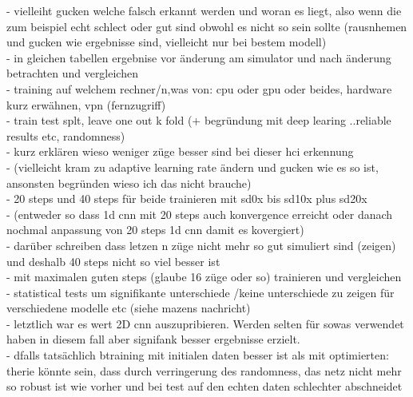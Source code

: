 - vielleiht gucken welche falsch erkannt werden und woran es liegt, also wenn die zum beispiel echt schlect oder gut sind obwohl es nicht so sein sollte (rausnhemen und gucken wie ergebnisse sind, vielleicht nur bei bestem modell)\\
- in gleichen tabellen ergebnise vor änderung am simulator und nach änderung betrachten und vergleichen\\
- training auf welchem rechner/n,was von: cpu oder gpu oder beides, hardware kurz erwähnen, vpn (fernzugriff)\\
- train test splt, leave one out k fold (+ begründung mit deep learing ..reliable results etc, randomness) \\
- kurz erklären wieso weniger züge besser sind bei dieser hci erkennung\\
- (vielleicht kram zu adaptive learning rate ändern und gucken wie es so ist, ansonsten begründen wieso ich das nicht brauche) \\
- 20 steps und 40 steps für beide trainieren mit sd0x bis sd10x plus sd20x\\
- (entweder so dass 1d cnn mit 20 steps auch konvergence erreicht oder danach nochmal anpassung von 20 steps 1d cnn damit es kovergiert)\\
- darüber schreiben dass letzen n züge nicht mehr so gut simuliert sind (zeigen) und deshalb 40 steps nicht so viel besser ist \\
- mit maximalen guten steps (glaube 16 züge oder so) trainieren und vergleichen\\
- statistical tests um signifikante unterschiede /keine unterschiede zu zeigen für verschiedene modelle etc (siehe mazens nachricht)\\
- letztlich war es wert 2D cnn auszupribieren. Werden selten für sowas verwendet haben in diesem fall aber signifank besser ergebnisse erzielt. \\
- dfalls tatsächlich btraining mit initialen daten besser ist als mit optimierten: therie könnte sein, dass durch verringerung des randomness, das netz nicht mehr so robust ist wie vorher und bei test auf den echten daten schlechter abschneidet
